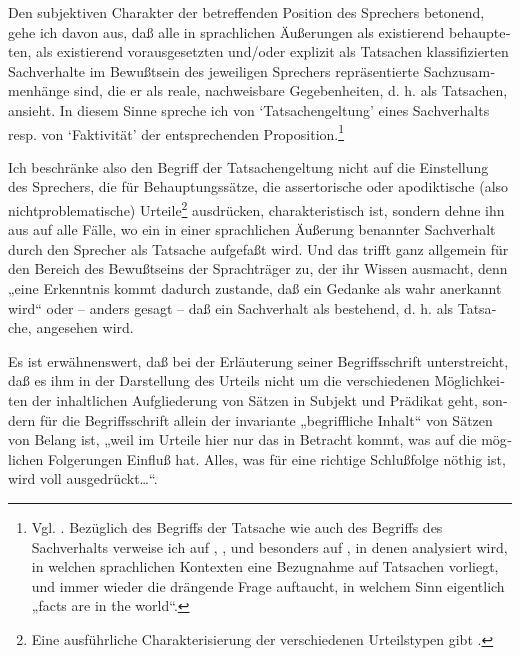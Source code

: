 \documentclass[output=paper]{langscibook}
\begin{document}
\begin{otherlanguage}{german}
Den subjektiven Charakter der betreffenden Position des Sprechers betonend, gehe ich davon aus, daß alle in sprachlichen Äußerungen als existierend behaupteten, als existierend vorausgesetzten und/oder explizit als Tatsachen klassifizierten Sachverhalte im Bewußtsein des jeweiligen Sprechers repräsentierte Sachzusammenhänge sind, die er als reale, nachweisbare Gegebenheiten, d. h. als Tatsachen, ansieht. In diesem Sinne spreche ich von ‘Tatsachengeltung’ eines Sachverhalts resp. von ‘Faktivität’ der entsprechenden Proposition.\footnote{Vgl. \citet{Zimmermann82Explizite-und}. Bezüglich des Begriffs der Tatsache wie auch des Begriffs des Sachverhalts verweise ich auf \citet{klaus1974philosophisches-worterbuch}, \citet{kondakov1971logiceskij-slovar-worterbuch-der-logik}, \citet{heitschm1969zur-bestimmung-eines-allgemeinen-begriffs-der-tatsache} und besonders auf \citet{vendler1967effects-results-and-consequences, vendler1967facts-and-events, vendler1970say-what-you-think, vendler1980telling-the-facts}, in denen analysiert wird, in welchen sprachlichen Kontexten eine Bezugnahme auf Tatsachen vorliegt, und immer wieder die drängende Frage auftaucht, in welchem Sinn eigentlich „facts are in the world“.}

Ich beschränke also den Begriff der Tatsachengeltung nicht auf die Einstellung des Sprechers, die für Behauptungssätze, die assertorische oder apodiktische (also nichtproblematische) Urteile\footnote{Eine ausführliche Charakterisierung der verschiedenen Urteilstypen gibt \citet{kondakov1971logiceskij-slovar-worterbuch-der-logik}.} ausdrücken, charakteristisch ist, sondern dehne ihn aus auf alle Fälle, wo ein in einer sprachlichen Äußerung benannter Sachverhalt durch den Sprecher als Tatsache aufgefaßt wird. Und das trifft ganz allgemein für den Bereich des Bewußtseins der Sprachträger zu, der ihr Wissen ausmacht, denn „eine Erkenntnis kommt dadurch zustande, daß ein Gedanke als wahr anerkannt wird“ \citet[227]{frege1924erkenntnisquellen-der-mathematik-und-der-mathematischen-naturwissenschaften} oder -- anders gesagt -- daß ein Sachverhalt als bestehend, d. h. als Tatsache, angesehen wird.

Es ist erwähnenswert, daß \citet[53]{frege1879begriffsschrift-eine-der-arithmetischen-nachgebildete-formelsprache-des-reinen-denkens-1879.} bei der Erläuterung seiner Begriffsschrift unterstreicht, daß es ihm in der Darstellung des Urteils nicht um die verschiedenen Möglichkeiten der inhaltlichen Aufgliederung von Sätzen in Subjekt und Prädikat geht, sondern für die Begriffsschrift allein der invariante „begriffliche Inhalt“ von Sätzen von Belang ist, „weil im Urteile hier nur das in Betracht kommt, was auf die möglichen Folgerungen Einfluß hat. Alles, was für eine richtige Schlußfolge nöthig ist, wird voll ausgedrückt…“.


\end{otherlanguage}
\end{document}

